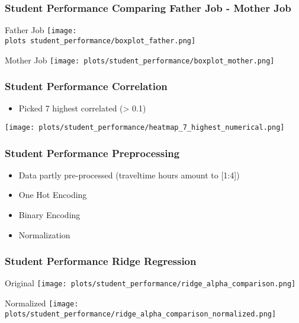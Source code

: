 \documentclass[aspectratio=169]{beamer}
\def \plots {./plots/}
\begin{document}
\begin{frame}{}
\frametitle{Student Performance Comparing Father Job - Mother Job}
\begin{minipage}{0.49\textwidth}
	\center Father Job
    \texttt{[image: \\plots student\_performance/boxplot\_father.png]}
\end{minipage}
\begin{minipage}{0.49\textwidth}
	\center Mother Job
    \texttt{[image: plots/student\_performance/boxplot\_mother.png]}
\end{minipage}
\end{frame}

\begin{frame}{}
\frametitle{Student Performance Correlation}
\begin{minipage}{0.3\textwidth}
\begin{itemize}
\item Picked 7 highest correlated (> 0.1)
\end{itemize}
\end{minipage}
\begin{minipage}{0.69\textwidth}
    \texttt{[image: plots/student\_performance/heatmap\_7\_highest\_numerical.png]}
\end{minipage}
\end{frame}

\begin{frame}{}
\frametitle{Student Performance Preprocessing}
\begin{minipage}{0.99\textwidth}
\begin{itemize}
\item Data partly pre-processed (traveltime hours amount to [1:4])
\item One Hot Encoding
\item Binary Encoding
\item Normalization
\end{itemize}
\end{minipage}
\end{frame}

\begin{frame}{}
\frametitle{Student Performance Ridge Regression}
\begin{minipage}{0.49\textwidth}
    \center Original
    \texttt{[image: plots/student\_performance/ridge\_alpha\_comparison.png]}
\end{minipage}
\begin{minipage}{0.49\textwidth}
    \center Normalized
    \texttt{[image: plots/student\_performance/ridge\_alpha\_comparison\_normalized.png]}
\end{minipage}
\end{frame}
\end{document}
